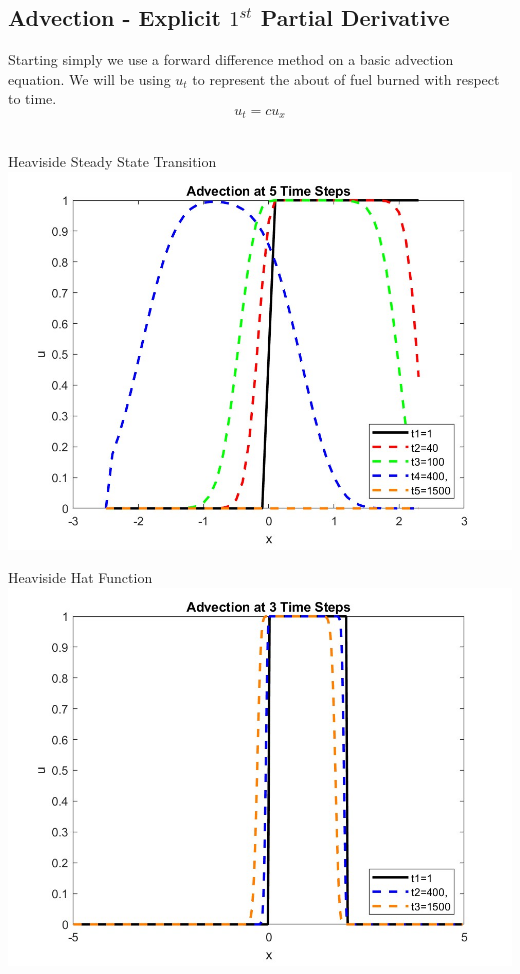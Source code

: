 \documentclass{article}
\begin{document}
\subsection{Advection - Explicit $1^{st}$ Partial Derivative}
Starting simply we use a forward difference method on a basic advection equation.  We will be using $u_t$ to represent the about of fuel burned with respect to time.
$$u_t=cu_x$$
\\
    \begin{minipage}[t]{.49\textwidth}
        \centering
            Heaviside Steady State Transition
            \includegraphics[scale=0.20]{Step1_HS_Advection_5_timestamps.jpg}
            \label{fig:HS-Advection}
    \end{minipage}
    \hfill
    \begin{minipage}[t]{.49\textwidth}
        \centering
        Heaviside Hat Function
       \includegraphics[scale=0.20]{Step1_Hat_Advection_3_timestamps.jpg}
       \label{fig:Hat-Advection}
    \end{minipage}
\end{document}

